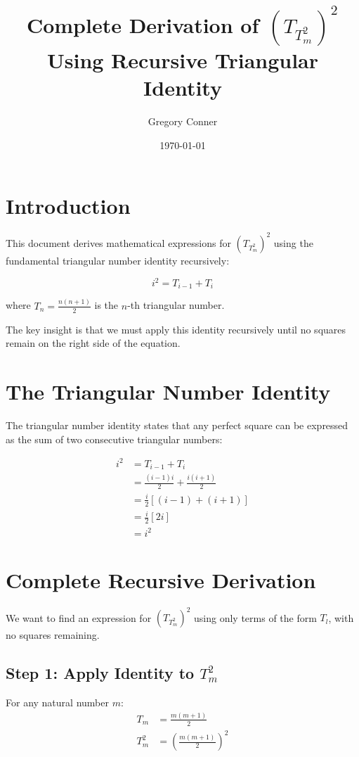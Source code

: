 \documentclass{article}
\title{Complete Derivation of $(T_{T_m^2})^2$ Using Recursive Triangular Identity}
\author{Gregory Conner}
\date{\today}
\begin{document}
\maketitle

\section{Introduction}

This document derives mathematical expressions for $(T_{T_m^2})^2$ using the fundamental triangular number identity recursively:

\begin{equation}
i^2 = T_{i-1} + T_i
\end{equation}

where $T_n = \frac{n(n+1)}{2}$ is the $n$-th triangular number.

The key insight is that we must apply this identity recursively until no squares remain on the right side of the equation.

\section{The Triangular Number Identity}

The triangular number identity states that any perfect square can be expressed as the sum of two consecutive triangular numbers:

\begin{align}
i^2 &= T_{i-1} + T_i \\
&= \frac{(i-1)i}{2} + \frac{i(i+1)}{2} \\
&= \frac{i}{2}[(i-1) + (i+1)] \\
&= \frac{i}{2}[2i] \\
&= i^2
\end{align}

\section{Complete Recursive Derivation}

We want to find an expression for $(T_{T_m^2})^2$ using only terms of the form $T_l$, with no squares remaining.

\subsection{Step 1: Apply Identity to $T_m^2$}

For any natural number $m$:
\begin{align}
T_m &= \frac{m(m+1)}{2} \\
T_m^2 &= \left(\frac{m(m+1)}{2}\right)^2
\end{align}
\end{document}

